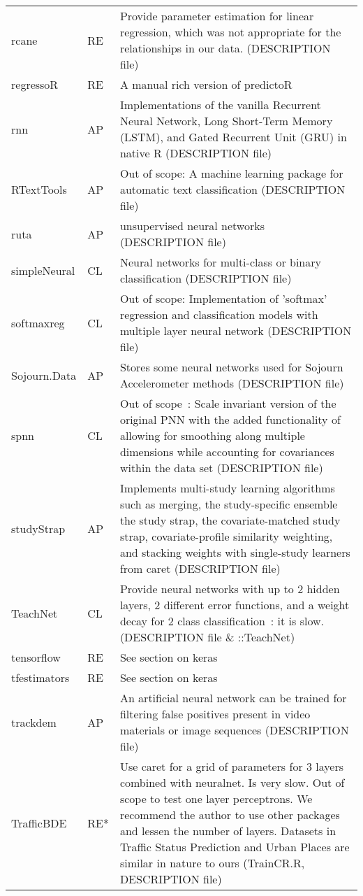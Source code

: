 \begin{Schunk}
\begin{longtable}[t]{ll>{\raggedright\arraybackslash}p{10cm}}
rcane & RE & Provide parameter estimation for linear regression, which was not appropriate for the relationships in our data. (DESCRIPTION file)\\
\addlinespace
regressoR & RE & A manual rich version of predictoR\\
rnn & AP & Implementations of the vanilla Recurrent Neural Network, Long Short-Term Memory (LSTM), and Gated Recurrent Unit (GRU) in native R (DESCRIPTION file)\\
RTextTools & AP & Out of scope: A machine learning package for automatic text classification (DESCRIPTION file)\\
ruta & AP & unsupervised neural networks (DESCRIPTION file)\\
simpleNeural & CL & Neural networks for multi-class or binary classification (DESCRIPTION file)\\
\addlinespace
softmaxreg & CL & Out of scope: Implementation of 'softmax' regression and classification models with multiple layer neural network (DESCRIPTION file)\\
Sojourn.Data & AP & Stores some neural networks used for Sojourn Accelerometer methods (DESCRIPTION file)\\
spnn & CL & Out of scope : Scale invariant version of the original PNN with the added functionality of allowing for smoothing along multiple dimensions while accounting for covariances within the data set (DESCRIPTION file)\\
studyStrap & AP & Implements multi-study learning algorithms such as merging, the study-specific ensemble the study strap, the covariate-matched study strap, covariate-profile similarity weighting, and stacking weights with single-study learners from caret (DESCRIPTION file)\\
TeachNet & CL & Provide neural networks with up to 2 hidden layers, 2 different error functions, and a weight decay for 2 class classification : it is slow. (DESCRIPTION file \& ::TeachNet)\\
\addlinespace
tensorflow & RE & See section on keras\\
tfestimators & RE & See section on keras\\
trackdem & AP & An artificial neural network can be trained for filtering false positives present in video materials or image sequences (DESCRIPTION file)\\
TrafficBDE & RE* & Use caret for a grid of parameters for 3 layers combined with neuralnet. Is very slow. Out of scope to test one layer perceptrons. We recommend the author to use other packages and lessen the number of layers. Datasets in Traffic Status Prediction and Urban Places are similar in nature to ours (TrainCR.R, DESCRIPTION file)\\

\end{longtable}
\end{Schunk}
